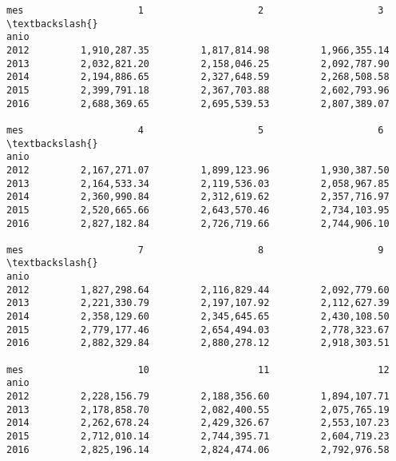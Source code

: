 \documentclass[11pt]{article}
\newcommand{\prompt}[4]{
        \llap{{\color{#2}[#3]: #4}}\vspace{-1.25em}
    }
\begin{document}
            \begin{tcolorbox}[breakable, boxrule=.5pt, size=fbox, pad at break*=1mm, opacityfill=0]
\prompt{Out}{outcolor}{68}{\hspace{3.5pt}}
\begin{Verbatim}[commandchars=\\\{\}]
mes                    1                    2                    3   \textbackslash{}
anio
2012         1,910,287.35         1,817,814.98         1,966,355.14
2013         2,032,821.20         2,158,046.25         2,092,787.90
2014         2,194,886.65         2,327,648.59         2,268,508.58
2015         2,399,791.18         2,367,703.88         2,602,793.96
2016         2,688,369.65         2,695,539.53         2,807,389.07

mes                    4                    5                    6   \textbackslash{}
anio
2012         2,167,271.07         1,899,123.96         1,930,387.50
2013         2,164,533.34         2,119,536.03         2,058,967.85
2014         2,360,990.84         2,312,619.62         2,357,716.97
2015         2,520,665.66         2,643,570.46         2,734,103.95
2016         2,827,182.84         2,726,719.66         2,744,906.10

mes                    7                    8                    9   \textbackslash{}
anio
2012         1,827,298.64         2,116,829.44         2,092,779.60
2013         2,221,330.79         2,197,107.92         2,112,627.39
2014         2,358,129.60         2,345,645.65         2,430,108.50
2015         2,779,177.46         2,654,494.03         2,778,323.67
2016         2,882,329.84         2,880,278.12         2,918,303.51

mes                    10                   11                   12
anio
2012         2,228,156.79         2,188,356.60         1,894,107.71
2013         2,178,858.70         2,082,400.55         2,075,765.19
2014         2,262,678.24         2,429,326.67         2,553,107.23
2015         2,712,010.14         2,744,395.71         2,604,719.23
2016         2,825,196.14         2,824,474.06         2,792,976.58
\end{Verbatim}
\end{tcolorbox}
        
\end{document}
